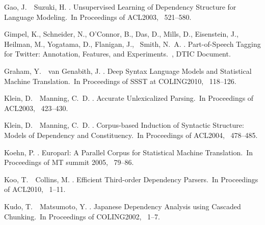 \documentclass[english]{jnlp_1.4}
\begin{document}
\begin{thebibliography}{}
Gao, J.\BBACOMMA\ \BBA\ Suzuki, H. \BBCP.
\newblock \BBOQ Unsupervised Learning of Dependency Structure for Language
  Modeling.\BBCQ\
\newblock In {\Bem Proceedings of ACL2003}, \mbox{\BPGS\ 521--580}.

Gimpel, K., Schneider, N., O'Connor, B., Das, D., Mills, D., Eisenstein, J.,
  Heilman, M., Yogatama, D., Flanigan, J., \BBA\ Smith, N.~A. \BBOP 2010\BBCP.
\newblock \BBOQ Part-of-Speech Tagging for Twitter: Annotation, Features, and
  Experiments.\BBCQ\
\newblock \BTR, DTIC Document.

Graham, Y.\BBACOMMA\ \BBA\ van Genabith, J. \BBOP 2010\BBCP.
\newblock \BBOQ Deep Syntax Language Models and Statistical Machine
  Translation.\BBCQ\
\newblock In {\Bem Proceedings of SSST at COLING2010}, \mbox{\BPGS\ 118--126}.

Klein, D.\BBACOMMA\ \BBA\ Manning, C.~D. \BBOP 2003\BBCP.
\newblock \BBOQ Accurate Unlexicalized Parsing.\BBCQ\
\newblock In {\Bem Proceedings of ACL2003}, \mbox{\BPGS\ 423--430}.

Klein, D.\BBACOMMA\ \BBA\ Manning, C.~D. \BBOP 2004\BBCP.
\newblock \BBOQ Corpus-based Induction of Syntactic Structure: Models of
  Dependency and Constituency.\BBCQ\
\newblock In {\Bem Proceedings of ACL2004}, \mbox{\BPGS\ 478--485}.

Koehn, P. \BBOP 2005\BBCP.
\newblock \BBOQ Europarl: A Parallel Corpus for Statistical Machine
  Translation.\BBCQ\
\newblock In {\Bem Proceedings of MT summit 2005}, \mbox{\BPGS\ 79--86}.

Koo, T.\BBACOMMA\ \BBA\ Collins, M. \BBCP.
\newblock \BBOQ Efficient Third-order Dependency Parsers.\BBCQ\
\newblock In {\Bem Proceedings of ACL2010}, \mbox{\BPGS\ 1--11}.

Kudo, T.\BBACOMMA\ \BBA\ Matsumoto, Y. \BBCP.
\newblock \BBOQ Japanese Dependency Analysis using Cascaded Chunking.\BBCQ\
\newblock In {\Bem Proceedings of COLING2002}, \mbox{\BPGS\ 1--7}.


\end{thebibliography}
\end{document}
